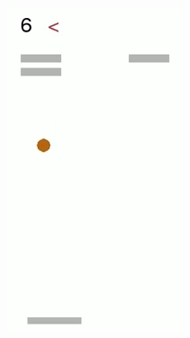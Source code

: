 \begin{figure}[h]
\begin{subfigure}[b]{0.23\textwidth}
	\end{subfigure}
	~ %
	\begin{subfigure}[b]{0.23\textwidth}
		\includegraphics[width=\textwidth]{images/breakout-33-bt-2bis.png}
	\end{subfigure}

\end{figure}
